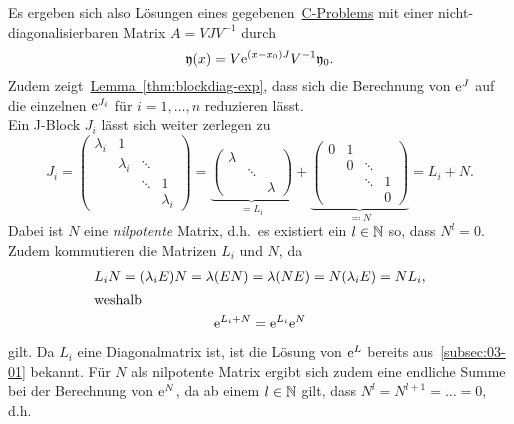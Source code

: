 Es ergeben sich also Lösungen eines gegebenen~\hyperref[eq:cp]{C-Problems} mit einer nicht-diagonalisierbaren Matrix $A = V J V^{-1}$ durch
\begin{equation*}
    \mathfrak{y}(x) = V \mathrm{e}^{(x - x_0) J} V^{-1} \mathfrak{y}_0.
\end{equation*}
Zudem zeigt~\hyperref[thm:blockdiag-exp]{Lemma~\ref*{thm:blockdiag-exp}},
dass sich die Berechnung von $\mathrm{e}^J$ auf die einzelnen $\mathrm{e}^{J_i}$ für $i = 1,\dots,n$ reduzieren lässt.\\
Ein J-Block $J_i$ lässt sich weiter zerlegen zu
\begin{equation*}
    J_i = \begin{pmatrix}
              \lambda_i & 1         &        & \\
                        & \lambda_i & \ddots & \\
                        &           & \ddots & 1 \\
                        &           &        & \lambda_i
    \end{pmatrix}
    = \underbrace{\begin{pmatrix}
        \lambda &        & \\
                & \ddots & \\
                &        & \lambda
    \end{pmatrix}}_{= L_i}
    + \underbrace{\begin{pmatrix}
          0 & 1 &        & \\
            & 0 & \ddots & \\
            &   & \ddots & 1 \\
            &   &        & 0
    \end{pmatrix}}_{\eqqcolon N}
    = L_i + N.
\end{equation*}
Dabei ist $N$ eine \emph{nilpotente} Matrix, d.h.\ es existiert ein $l \in \mathbb{N}$ so, dass $N^l = 0$.
Zudem kommutieren die Matrizen $L_i$ und $N$, da
\begin{gather*}
    L_i N = (\lambda_i E) N = \lambda (EN) = \lambda (NE) = N (\lambda_i E) = N L_i,\\
    \intertext{weshalb}
    \mathrm{e}^{L_i + N} = \mathrm{e}^{L_i} \mathrm{e}^N
\end{gather*}
gilt.
Da $L_i$ eine Diagonalmatrix ist, ist die Lösung von $\mathrm{e}^L$ bereits aus~\autoref{subsec:03-01} bekannt.
Für $N$ als nilpotente Matrix ergibt sich zudem eine endliche Summe bei der Berechnung von $\mathrm{e}^N$,
da ab einem $l \in \mathbb{N}$ gilt, dass $N^l = N^{l+1} = \dots = 0$, d.h.
